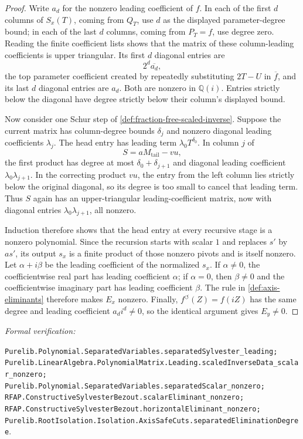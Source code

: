 \documentclass[11pt]{article}
\newcommand{\Qi}{\mathbb{Q}(i)}
\newcommand{\leanref}[1]{\par\smallskip\noindent
  \emph{Formal verification:}\par\nobreak
  {\raggedright\nolinkurl{#1}.\par}}
\begin{document}
\begin{proof}
Write $a_d$ for the nonzero leading coefficient of $f$.  In each of the
first $d$ columns of $S_x(T)$, coming from $Q_T$, use $d$ as the displayed
parameter-degree bound; in each of the last $d$ columns, coming from
$P_T=f$, use degree zero.  Reading the finite coefficient lists shows that
the matrix of these column-leading coefficients is upper triangular.  Its
first $d$ diagonal entries are
\[
                  2^d\overline{a_d},
\]
the top parameter coefficient created by repeatedly substituting $2T-U$
in $\overline f$, and its last $d$ diagonal entries are $a_d$.  Both are
nonzero in $\Qi$.  Entries strictly below the diagonal have degree strictly
below their column's displayed bound.

Now consider one Schur step of \cref{def:fraction-free-scaled-inverse}.
Suppose the current matrix has column-degree bounds $\delta_j$ and nonzero
diagonal leading coefficients $\lambda_j$.  The head entry has leading term
$\lambda_0T^{\delta_0}$.  In column $j$ of
\[
                 S=aM_{\mathrm{tail}}-vu,
\]
the first product has degree at most $\delta_0+\delta_{j+1}$ and diagonal
leading coefficient $\lambda_0\lambda_{j+1}$.  In the correcting product
$vu$, the entry from the left column lies strictly below the original
diagonal, so its degree is too small to cancel that leading term.  Thus $S$
again has an upper-triangular leading-coefficient matrix, now with diagonal
entries $\lambda_0\lambda_{j+1}$, all nonzero.

Induction therefore shows that the head entry at every recursive stage is a
nonzero polynomial.  Since the recursion starts with scalar $1$ and replaces
$s'$ by $as'$, its output $s_x$ is a finite product of those nonzero pivots
and is itself nonzero.  Let $\alpha+i\beta$ be the leading coefficient of
the normalized $s_x$.  If $\alpha\ne0$, the coefficientwise real part has
leading coefficient $\alpha$; if $\alpha=0$, then $\beta\ne0$ and the
coefficientwise imaginary part has leading coefficient $\beta$.  The rule in
\cref{def:axis-eliminants} therefore makes $E_x$ nonzero.  Finally,
$f^{\circlearrowleft}(Z)=f(iZ)$ has the same degree and leading coefficient
$a_di^d\ne0$, so the identical argument gives $E_y\ne0$.
\end{proof}

\leanref{Purelib.Polynomial.SeparatedVariables.separatedSylvester_leading;
Purelib.LinearAlgebra.PolynomialMatrix.Leading.scaledInverseData_scalar_nonzero;
Purelib.Polynomial.SeparatedVariables.separatedScalar_nonzero;
RFAP.ConstructiveSylvesterBezout.scalarEliminant_nonzero;
RFAP.ConstructiveSylvesterBezout.horizontalEliminant_nonzero;
Purelib.RootIsolation.Isolation.AxisSafeCuts.separatedEliminationDegree}
\end{document}
